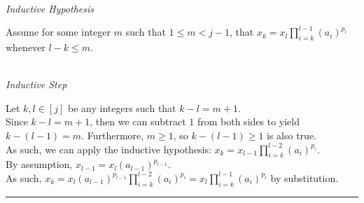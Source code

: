 \documentclass[a4paper,12pt]{article}
\begin{document}
\noindent \\
\textit{Inductive Hypothesis}

\noindent Assume for some integer $m$ such that $1 \leq m < j - 1$, that $\displaystyle x_k = x_l \prod_{i = k}^{l - 1} (a_i)^{p_i}$ whenever $l - k \leq m$.

\noindent \\
\textit{Inductive Step}

\noindent Let $k, l \in [j]$ be any integers such that $k - l = m + 1$.\\

\noindent Since $k - l = m + 1$, then we can subtract $1$ from both sides to yield $k - (l - 1) = m$. Furthermore, $m \geq 1$, so $k - (l - 1) \geq 1$ is also true.\\

\noindent As such, we can apply the inductive hypothesis: $\displaystyle x_k = x_{l - 1} \prod_{i = k}^{l - 2}(a_i)^{p_i}$.\\

\noindent By assumption, $x_{l - 1} = x_l(a_{l - 1})^{p_{l - 1}}$.\\

\noindent As such, $\displaystyle x_k = x_l(a_{l - 1})^{p_{l - 1}} \prod_{i = k}^{l - 2}(a_i)^{p_i} = x_l \prod_{i = k}^{l - 1}(a_i)^{p_i}$ by substitution.

\begin{center}
\noindent\rule{8cm}{0.4pt}
\end{center}
\noindent \\
\end{document}
